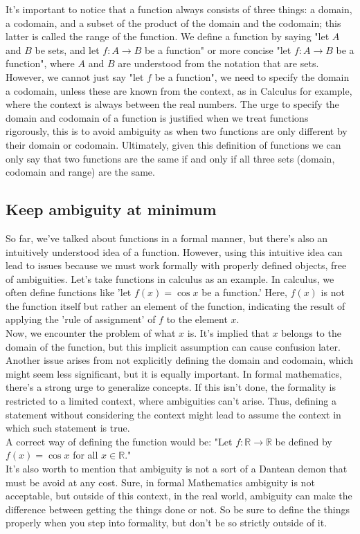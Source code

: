 \documentclass{report}
\begin{document}
    It's important to notice that a function always consists of three things: a domain, a codomain, and a subset of the product of the domain and the codomain; this latter is called the range of the function. We define a function by saying "let $A$ and $B$ be sets, and let $f: A \rightarrow B$ be a function" or more concise "let $f: A \rightarrow B$ be a function", where $A$ and $B$ are understood from the notation that are sets. However, we cannot just say "let $f$ be a function", we need to specify the domain a codomain, unless these are known from the context, as in Calculus for example, where the context is always between the real numbers. The urge to specify the domain and codomain of a function is justified when we treat functions rigorously, this is to avoid ambiguity as when two functions are only different by their domain or codomain. Ultimately, given this definition of functions we can only say that two functions are the same if and only if all three sets (domain, codomain and range) are the same.

    \subsection*{Keep ambiguity at minimum}

    So far, we've talked about functions in a formal manner, but there's also an intuitively understood idea of a function. However, using this intuitive idea can lead to issues because we must work formally with properly defined objects, free of ambiguities. Let's take functions in calculus as an example. In calculus, we often define functions like 'let \(f(x) = \cos x\) be a function.' Here, \(f(x)\) is not the function itself but rather an element of the function, indicating the result of applying the 'rule of assignment' of \(f\) to the element \(x\).\\

    Now, we encounter the problem of what \(x\) is. It's implied that \(x\) belongs to the domain of the function, but this implicit assumption can cause confusion later. Another issue arises from not explicitly defining the domain and codomain, which might seem less significant, but it is equally important. In formal mathematics, there's a strong urge to generalize concepts. If this isn't done, the formality is restricted to a limited context, where ambiguities can't arise. Thus, defining a statement without considering the context might lead to assume the context in which such statement is true.\\

    A correct way of defining the function would be: "Let \(f: \mathbb{R} \rightarrow \mathbb{R}\) be defined by \(f(x) = \cos x\) for all \(x \in \mathbb{R}\)."\\

    It's also worth to mention that ambiguity is not a sort of a Dantean demon that must be avoid at any cost. Sure, in formal Mathematics ambiguity is not acceptable, but outside of this context, in the real world, ambiguity can make the difference between getting the things done or not. So be sure to define the things properly when you step into formality, but don't be so strictly outside of it.\\

    
\end{document}
